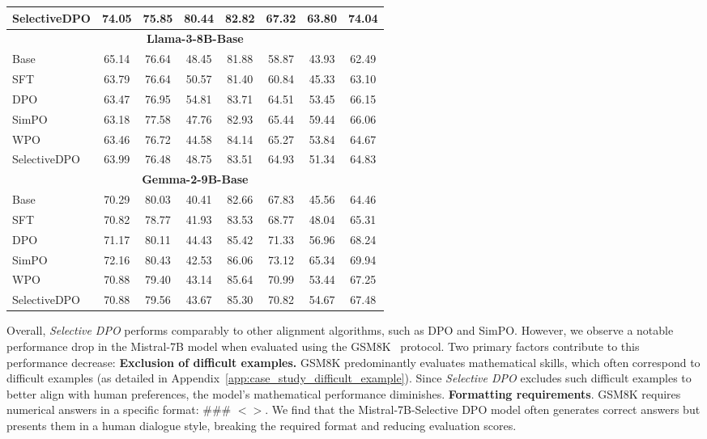 \begin{table}[h]
{\begin{tabular}{l c c c c c c c}
SelectiveDPO &74.05	&75.85	&80.44	&82.82	&67.32	&63.80	&74.04 \\
\midrule
\multicolumn{8}{c}{\textbf{Llama-3-8B-Base}}  \\
\midrule
Base	     &65.14	&76.64	&48.45	&81.88	&58.87	&43.93	&62.49 \\ 
SFT	         &63.79	&76.64	&50.57	&81.40	&60.84	&45.33	&63.10 \\ 
DPO	         &63.47	&76.95	&54.81	&83.71	&64.51	&53.45	&66.15 \\ 
SimPO	     &63.18	&77.58	&47.76	&82.93	&65.44	&59.44	&66.06 \\
WPO	         &63.46	&76.72	&44.58	&84.14	&65.27	&53.84	&64.67 \\ 
SelectiveDPO &63.99	&76.48	&48.75	&83.51	&64.93	&51.34	&64.83 \\ 
\midrule
\multicolumn{8}{c}{\textbf{Gemma-2-9B-Base}}  \\
\midrule			
Base	     &70.29	&80.03	&40.41	&82.66	&67.83	&45.56	&64.46 \\
SFT	         &70.82	&78.77	&41.93	&83.53	&68.77	&48.04	&65.31 \\ 
DPO	         &71.17	&80.11	&44.43	&85.42	&71.33	&56.96	&68.24 \\ 
SimPO	     &72.16	&80.43	&42.53	&86.06	&73.12	&65.34	&69.94 \\ 
WPO	         &70.88	&79.40	&43.14	&85.64	&70.99	&53.44	&67.25 \\ 
SelectiveDPO &70.88	&79.56	&43.67	&85.30	&70.82	&54.67	&67.48 \\ 
\bottomrule
\end{tabular}
}
\label{tab:down-stream-task}
\end{table}

Overall, \textit{Selective DPO} performs comparably to other alignment algorithms, such as DPO and SimPO. However, we observe a notable performance drop in the Mistral-7B model when evaluated using the GSM8K~\cite{cobbe2021gsm8k} protocol.
Two primary factors contribute to this performance decrease: \textbf{Exclusion of difficult examples.} GSM8K predominantly evaluates mathematical skills, which often correspond to difficult examples (as detailed in Appendix~\ref{app:case_study_difficult_example}). Since \textit{Selective DPO} excludes such difficult examples to better align with human preferences, the model’s mathematical performance diminishes. \textbf{Formatting requirements}. GSM8K requires numerical answers in a specific format: \textsc{\#\#\# $<$$>$}. We find that the Mistral-7B-Selective DPO model often generates correct answers but presents them in a human dialogue style, breaking the required format and reducing evaluation scores. 

